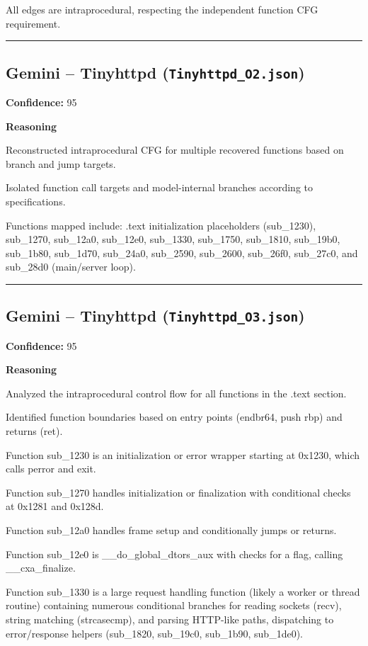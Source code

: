 All edges are intraprocedural, respecting the independent function CFG requirement.

\bigskip
\hrule
\bigskip

\subsection{Gemini -- Tinyhttpd (\texttt{Tinyhttpd\_O2.json})}

\textbf{Confidence:} 95

\textbf{Reasoning}

Reconstructed intraprocedural CFG for multiple recovered functions based on branch and jump targets.

Isolated function call targets and model-internal branches according to specifications.

Functions mapped include: .text initialization placeholders (sub\_1230), sub\_1270, sub\_12a0, sub\_12e0, sub\_1330, sub\_1750, sub\_1810, sub\_19b0, sub\_1b80, sub\_1d70, sub\_24a0, sub\_2590, sub\_2600, sub\_26f0, sub\_27c0, and sub\_28d0 (main/server loop).

\bigskip
\hrule
\bigskip

\subsection{Gemini -- Tinyhttpd (\texttt{Tinyhttpd\_O3.json})}

\textbf{Confidence:} 95

\textbf{Reasoning}

Analyzed the intraprocedural control flow for all functions in the .text section.

Identified function boundaries based on entry points (endbr64, push rbp) and returns (ret).

Function sub\_1230 is an initialization or error wrapper starting at 0x1230, which calls perror and exit.

Function sub\_1270 handles initialization or finalization with conditional checks at 0x1281 and 0x128d.

Function sub\_12a0 handles frame setup and conditionally jumps or returns.

Function sub\_12e0 is \_\_do\_global\_dtors\_aux with checks for a flag, calling \_\_cxa\_finalize.

Function sub\_1330 is a large request handling function (likely a worker or thread routine) containing numerous conditional branches for reading sockets (recv), string matching (strcasecmp), and parsing HTTP-like paths, dispatching to error/response helpers (sub\_1820, sub\_19c0, sub\_1b90, sub\_1de0).

